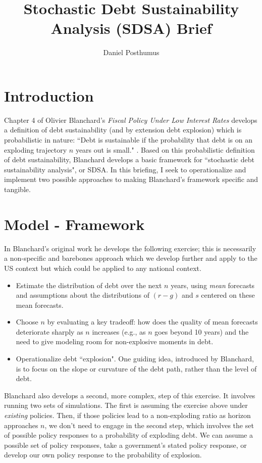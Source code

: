 \documentclass{article}
\title{Stochastic Debt Sustainability Analysis (SDSA) Brief}
\author{Daniel Posthumus}
\begin{document}
\maketitle

\tableofcontents

\section{Introduction}

Chapter 4 of Olivier Blanchard's \textit{Fiscal Policy Under Low Interest Rates} develops a definition of debt sustainability (and by extension debt explosion) which is probabilistic in nature: ``Debt is sustainable if the probability that debt is on an exploding trajectory $n$ years out is small." \parencite{Blanchard2023}. Based on this probabilistic definition of debt sustainability, Blanchard develops a basic framework for ``stochastic debt sustainability analysis", or SDSA. In this briefing, I seek to operationalize and implement two possible approaches to making Blanchard's framework specific and tangible.

\section{Model - Framework}

In Blanchard's original work he develops the following exercise; this is necessarily a non-specific and barebones approach which we develop further and apply to the US context but which could be applied to any national context. 
\begin{itemize}
	\item Estimate the distribution of debt over the next $n$ years, using \textit{mean} forecasts and assumptions about the distributions of $(r-g)$ and $s$ centered on these mean forecasts.
	\item Choose $n$ by evaluating a key tradeoff: how does the quality of mean forecasts deteriorate sharply as $n$ increases (e.g., as $n$ goes beyond 10 years) and the need to give modeling room for non-explosive moments in debt.
	\item Operationalize debt ``explosion". One guiding idea, introduced by Blanchard, is to focus on the slope or curvature of the debt path, rather than the level of debt.
\end{itemize}

Blanchard also develops a second, more complex, step of this exercise. It involves running two sets of simulations. The first is assuming the exercise above under \textit{existing} policies. Then, if those policies lead to a non-exploding ratio as horizon approaches $n$, we don't need to engage in the second step, which involves the set of possible policy responses to a probability of exploding debt. We can assume a possible set of policy responses, take a government's stated policy response, or develop our own policy response to the probability of explosion.
\end{document}
